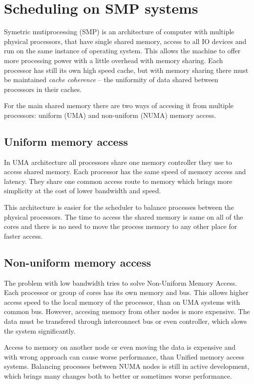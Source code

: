 \section{Scheduling on SMP systems}
Symetric mutiprocessing (SMP) is an architecture of computer with multiple
physical processors, that have single shared memory, access to all IO devices
and run on the same instance of operating system. This allows the machine to
offer more processing power with a little overhead with memory sharing. Each
processor has still its own high speed cache, but with memory sharing there must
be maintained \emph{cache coherence} -- the uniformity of data shared between
processors in their caches.

For the main shared memory there are two ways of accesing it from multiple
processors: uniform (UMA) and non-uniform (NUMA) memory access.

\subsection{Uniform memory access}
In UMA architecture all processors share one memory controller they use to
access shared memory. Each processor has the same speed of memory access and
latency. They share one common access route to memory which brings more
simplicity at the cost of lower bandwidth and speed.

This architecture is easier for the scheduler to balance processes between
the physical processors. The time to access the shared memory is same on all of
the cores and there is no need to move the process memory to any other place for
faster access.

\subsection{Non-uniform memory access}
The problem with low bandwidth tries to solve Non-Uniform Memory Access.
Each processor or group of cores has its own memory and bus. This allows higher
access speed to the local memory of the processor, than on UMA systems with
common bus. However, accesing memory from other nodes is more expensive. The
data must be transfered through interconnect bus or even controller, which slows
the system significantly.

Access to memory on another node or even moving the data is expensive and with
wrong approach can cause worse performance, than Unified memory access systems.
Balancing processes between NUMA nodes is still in active development, which
brings many changes both to better or sometimes worse performance.


